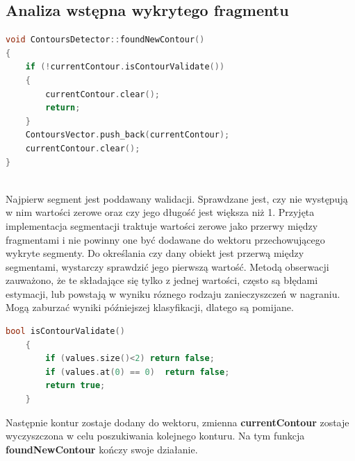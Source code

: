 \documentclass[a4paper,12 pt]{report}
\begin{document}
\subsection{Analiza wstępna wykrytego fragmentu}
\begin{lstlisting}[caption={Funkcja zajmująca się analizą wstępną wykrytego segmentu},label={lst:label},language=C++]
void ContoursDetector::foundNewContour()
{
    if (!currentContour.isContourValidate())
    {
        currentContour.clear();
        return;
    }
    ContoursVector.push_back(currentContour);
    currentContour.clear();
}    
                
\end{lstlisting}
Najpierw segment jest poddawany walidacji. Sprawdzane jest, czy nie występują w nim wartości zerowe oraz czy jego długość jest większa niż 1. Przyjęta implementacja segmentacji traktuje wartości zerowe jako przerwy między fragmentami i nie powinny one być dodawane do wektoru przechowującego wykryte segmenty. Do określania czy dany obiekt jest przerwą między segmentami, wystarczy sprawdzić jego pierwszą wartość.
Metodą obserwacji zauważono, że te składające się tylko z jednej wartości, często są błędami estymacji, lub powstają w wyniku róznego rodzaju zanieczyszczeń w nagraniu. Mogą zaburzać wyniki późniejszej klasyfikacji, dlatego są pomijane.
\begin{lstlisting}[caption={Funkcja dokonująca walidacji segmentu},label={lst:label},language=C++]
    bool isContourValidate()
    {
        if (values.size()<2) return false;
        if (values.at(0) == 0)  return false;
        return true;
    }
\end{lstlisting}

Następnie kontur zostaje dodany do wektoru,  zmienna \textbf{currentContour} zostaje wyczyszczona w celu poszukiwania kolejnego konturu. Na tym funkcja \textbf{foundNewContour} kończy swoje działanie.
\end{document}
